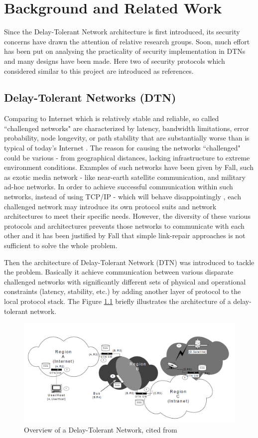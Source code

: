 \chapter{Background and Related Work}
Since the Delay-Tolerant Network architecture is first introduced, its security concerns have drawn the attention of relative research groups. Soon, much effort has been put on analysing the practicality of security implementation in DTNs and many designs have been made. Here two of security protocols which considered similar to this project are introduced as references.

\section{Delay-Tolerant Networks (DTN)}
Comparing to Internet which is relatively stable and reliable, so called ``challenged networks" are characterized by latency, bandwidth limitations, error probability, node longevity, or path stability that are substantially worse than is typical of today’s Internet \cite{Kevin}. The reason for causing the networks ``challenged" could be various - from geographical distances, lacking infrastructure to extreme environment conditions. Examples of such networks have been given by Fall, such as exotic media network - like near-earth satellite communication, and military ad-hoc networks. In order to achieve successful communication within such networks, instead of using TCP/IP - which will behave disappointingly \cite{Scott}, each challenged network may introduce its own protocol suits and network architectures to meet their specific needs. However, the diversity of these various protocols and architectures prevents those networks to communicate with each other and it has been justified by Fall \cite{Kevin} that simple link-repair approaches is not sufficient to solve the whole problem.

Then the architecture of Delay-Tolerant Network (DTN) was introduced to tackle the problem. Basically it achieve communication between various disparate challenged networks with significantly different sets of physical and operational constraints (latency, stability, etc.) by adding another layer of protocol to the local protocol stack. The Figure \ref{fig:dtn} briefly illustrates the architecture of a delay-tolerant network.

\begin{figure}[h!]
\centering
\includegraphics[width=\textwidth,natwidth=1420,natheight=672]{figures/dtn.png}
\caption{Overview of a Delay-Tolerant Network, cited from \cite{Kevin}}
\label{fig:dtn}
\end{figure}

